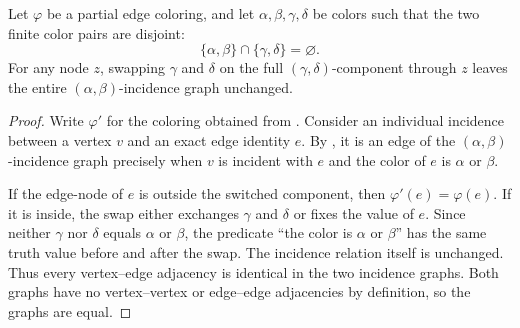 \begin{helper}
Let $\varphi$ be a partial edge coloring, and let
$\alpha,\beta,\gamma,\delta$ be colors such that the two finite color pairs
are disjoint:
\[
\{\alpha,\beta\}\cap\{\gamma,\delta\}=\varnothing.
\]
For any node $z$, swapping $\gamma$ and $\delta$ on the full
$(\gamma,\delta)$-component through $z$ leaves the entire
$(\alpha,\beta)$-incidence graph unchanged.
\end{helper}
\begin{proof}
Write $\varphi'$ for the coloring obtained from
.  Consider an individual incidence between
a vertex $v$ and an exact edge identity $e$.  By
, it is an edge of the
$(\alpha,\beta)$-incidence graph precisely when $v$ is incident with
$e$ and the color of $e$ is $\alpha$ or $\beta$.

If the edge-node of $e$ is outside the switched component, then
$\varphi'(e)=\varphi(e)$.  If it is inside, the swap either exchanges
$\gamma$ and $\delta$ or fixes the value of $e$.  Since neither
$\gamma$ nor $\delta$ equals $\alpha$ or $\beta$, the predicate
``the color is $\alpha$ or $\beta$'' has the same truth value before and
after the swap.  The incidence relation itself is unchanged.  Thus every
vertex--edge adjacency is identical in the two incidence graphs.  Both
graphs have no vertex--vertex or edge--edge adjacencies by definition, so
the graphs are equal.
\end{proof}
